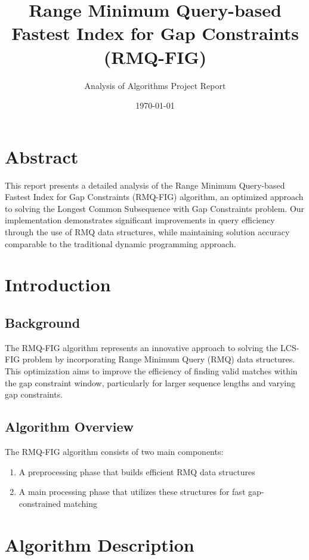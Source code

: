 \documentclass{article}
\title{Range Minimum Query-based Fastest Index for Gap Constraints (RMQ-FIG)}
\author{Analysis of Algorithms Project Report}
\date{\today}
\begin{document}
\maketitle

\section*{Abstract}
This report presents a detailed analysis of the Range Minimum Query-based Fastest Index for Gap Constraints (RMQ-FIG) algorithm, an optimized approach to solving the Longest Common Subsequence with Gap Constraints problem. Our implementation demonstrates significant improvements in query efficiency through the use of RMQ data structures, while maintaining solution accuracy comparable to the traditional dynamic programming approach.

\section{Introduction}

\subsection{Background}
The RMQ-FIG algorithm represents an innovative approach to solving the LCS-FIG problem by incorporating Range Minimum Query (RMQ) data structures. This optimization aims to improve the efficiency of finding valid matches within the gap constraint window, particularly for larger sequence lengths and varying gap constraints.

\subsection{Algorithm Overview}
The RMQ-FIG algorithm consists of two main components:
\begin{enumerate}
    \item A preprocessing phase that builds efficient RMQ data structures
    \item A main processing phase that utilizes these structures for fast gap-constrained matching
\end{enumerate}

\section{Algorithm Description}
\end{document}
